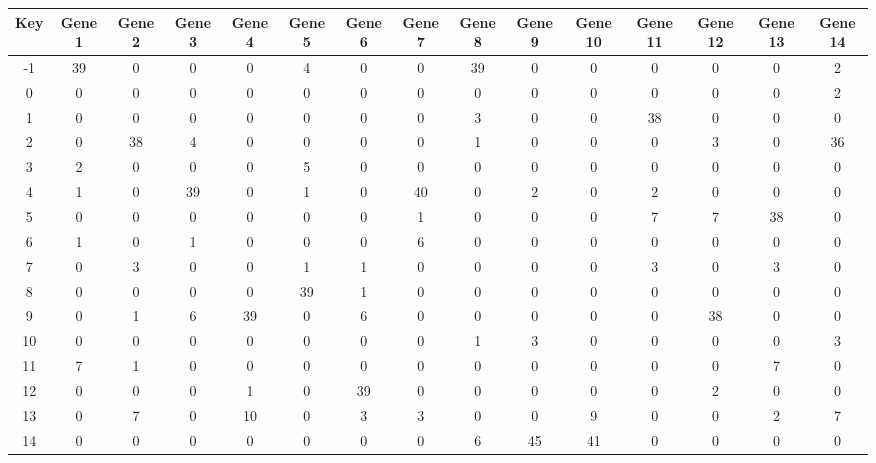 \begin{tabular}{|c|c|c|c|c|c|c|c|c|c|c|c|c|c|c|}
\hline
Key & Gene 1 & Gene 2 & Gene 3 & Gene 4 & Gene 5 & Gene 6 & Gene 7 & Gene 8 & Gene 9 & Gene 10 & Gene 11 & Gene 12 & Gene 13 & Gene 14 \\
\hline
-1 & 39 & 0 & 0 & 0 & 4 & 0 & 0 & 39 & 0 & 0 & 0 & 0 & 0 & 2 \\
0 & 0 & 0 & 0 & 0 & 0 & 0 & 0 & 0 & 0 & 0 & 0 & 0 & 0 & 2 \\
1 & 0 & 0 & 0 & 0 & 0 & 0 & 0 & 3 & 0 & 0 & 38 & 0 & 0 & 0 \\
2 & 0 & 38 & 4 & 0 & 0 & 0 & 0 & 1 & 0 & 0 & 0 & 3 & 0 & 36 \\
3 & 2 & 0 & 0 & 0 & 5 & 0 & 0 & 0 & 0 & 0 & 0 & 0 & 0 & 0 \\
4 & 1 & 0 & 39 & 0 & 1 & 0 & 40 & 0 & 2 & 0 & 2 & 0 & 0 & 0 \\
5 & 0 & 0 & 0 & 0 & 0 & 0 & 1 & 0 & 0 & 0 & 7 & 7 & 38 & 0 \\
6 & 1 & 0 & 1 & 0 & 0 & 0 & 6 & 0 & 0 & 0 & 0 & 0 & 0 & 0 \\
7 & 0 & 3 & 0 & 0 & 1 & 1 & 0 & 0 & 0 & 0 & 3 & 0 & 3 & 0 \\
8 & 0 & 0 & 0 & 0 & 39 & 1 & 0 & 0 & 0 & 0 & 0 & 0 & 0 & 0 \\
9 & 0 & 1 & 6 & 39 & 0 & 6 & 0 & 0 & 0 & 0 & 0 & 38 & 0 & 0 \\
10 & 0 & 0 & 0 & 0 & 0 & 0 & 0 & 1 & 3 & 0 & 0 & 0 & 0 & 3 \\
11 & 7 & 1 & 0 & 0 & 0 & 0 & 0 & 0 & 0 & 0 & 0 & 0 & 7 & 0 \\
12 & 0 & 0 & 0 & 1 & 0 & 39 & 0 & 0 & 0 & 0 & 0 & 2 & 0 & 0 \\
13 & 0 & 7 & 0 & 10 & 0 & 3 & 3 & 0 & 0 & 9 & 0 & 0 & 2 & 7 \\
14 & 0 & 0 & 0 & 0 & 0 & 0 & 0 & 6 & 45 & 41 & 0 & 0 & 0 & 0 \\
\hline
\end{tabular}